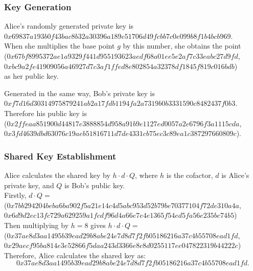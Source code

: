 \documentclass[12pt,a4paper]{article}
\begin{document}
\subsubsection{Key Generation} \noindent
Alice's randomly generated private key is \\
{\footnotesize $0x69837a193b0f43bac8b32a30396a189c51706d49fcbb7c0e099b8f1b4bcb969$}. \\
When she multiplies the base point $g$ by this number, she obtains the point \\
({\footnotesize $0x67bf8995372ae1a9329f441d955193623aedf68a01ee5e2af7c33eabc27d9fd$}, \\
{\footnotesize $0xbc9a2fe41909056a46927d7c3af1ffed8e802854a32378df1845f819c016bdb$}) \\
as her public key.

Generated in the same way, Bob's private key is \\
{\footnotesize $0xf7d16d30314975879241ab2a17fdb1194fa2a7319b0b3331590c8482437f0b3$}. \\
Therefore his public key is \\
({\footnotesize $0x2ffeaa851900d44817e3888854d958a91b9e1127ed0057a2e6796f3a1115cda$}, \\
{\footnotesize $0x3fd4639dbd63076c19aeb51816711d7de4331cb75ec3c89ea1c387297660809c$}).


\subsubsection{Shared Key Establishment} \noindent
Alice calculates the shared key by $h \cdot d \cdot Q$, 
where $h$ is the cofactor, $d$ is Alice's private key, and $Q$ is Bob's public key. \\
Firstly, $d \cdot Q = $\\
({\footnotesize $0x7bb294204beba6ba902f5a21e14c4d5abc953d52b79be70377104f72de310a4a$}, \\
{\footnotesize $0x6d9d2ec13fc729a629259a1fcdf96d4a66e7e4e1365f54ed5fa56e235bc74b5$}) \\
Then multiplying by $h = 8$ gives $h \cdot d \cdot Q = $\\
({\footnotesize $0x37ae8d3aa1495b39ead29b8abe24e7d8d7f2fb05186216a37c4b55708ead1fd$}, \\
{\footnotesize $0x29aecf95ba814e3e52866f5daa243d3366e8c8d0255117ee047822319b44222c$}) \\
Therefore, Alice calculates the shared key as: 
\begin{equation} \label{AliceKey}
    0x37ae8d3aa1495b39ead29b8abe24e7d8d7f2fb05186216a37c4b55708ead1fd.
\end{equation}
\end{document}
